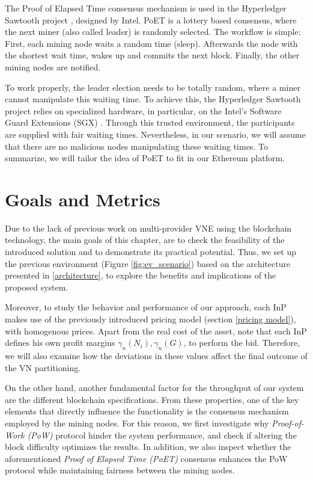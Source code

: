 The Proof of Elapsed Time consensus mechanism is used in the Hyperledger Sawtooth project \citep{sawtooth}, designed by Intel. PoET is a lottery based consensus, where the next miner (also called leader) is randomly selected. The workflow is simple: First, each mining node waits a random time (sleep). Afterwards the node with the shortest wait time, wakes up and commits the next block. Finally, the other mining nodes are notified.

To work properly, the leader election needs to be totally random, where a miner cannot manipulate this waiting time. To achieve this, the Hyperledger Sawtooth project relies on specialized hardware, in particular, on the Intel’s Software Guard Extensions (SGX) \citep{sgx}. Through this trusted environment, the participants are supplied with fair waiting times. Nevertheless, in our scenario, we will assume that there are no malicious nodes manipulating these waiting times. To summarize, we will tailor the idea of PoET to fit in our Ethereum platform.
 
\section{Goals and Metrics}  \label{metrics}

Due to the lack of previous work on multi-provider VNE using the blockchain technology, the main goals of this chapter, are to check the feasibility of the introduced solution and to demonstrate its practical potential. Thus, we set up the previous environment (Figure \ref{fig:ev_scenario}) based on the architecture presented in \ref{architecture}, to explore the benefits and implications of the proposed system.

Moreover, to study the behavior and performance of our approach, each InP makes use of the previously introduced pricing model (section \ref{pricing model}), with homogenous prices. Apart from the real cost of the asset, note that each InP defines his own profit margins $\gamma_n(N_i),\gamma_n(G)$, to perform the bid. Therefore, we will also examine how the deviations in these values affect the final outcome of the VN partitioning.

On the other hand, another fundamental factor for the throughput of our system are the different blockchain specifications. From these properties, one of the key elements that directly influence the functionality is the consensus mechanism employed by the mining nodes. For this reason, we first investigate why \textit{Proof-of-Work (PoW)} protocol hinder the system performance, and check if altering the block difficulty optimizes the results. In addition, we also inspect whether the aforementioned \textit{Proof of Elapsed Time (PoET)} consensus enhances the PoW protocol while maintaining fairness between the mining nodes.

